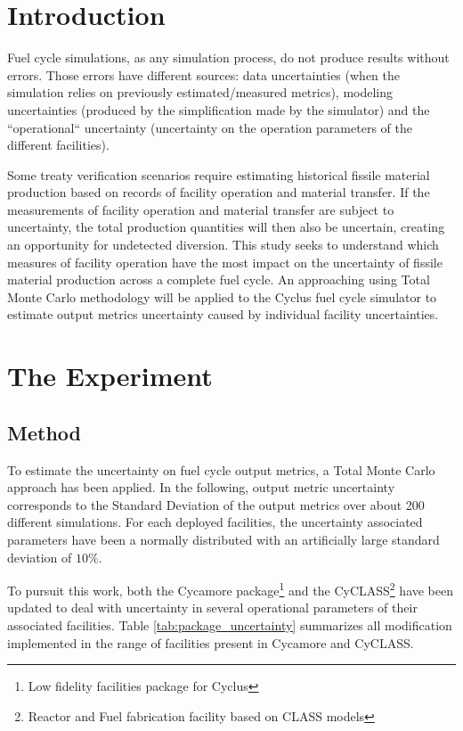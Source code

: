 \documentclass{anstrans}
\title{}
\author{Baptiste Mouginot,$^{*}$ Kathryn Mummah,$^{*}$ Paul P.H.  Wilson$^{*}$}
\institute{
$^{*}$University of Wisconsin-Madison, WI
}
\begin{document}
\section{Introduction}

Fuel cycle simulations, as any simulation process, do not produce results
without errors.  Those errors have different sources: data uncertainties (when
the simulation relies on previously estimated/measured metrics), modeling
uncertainties (produced by the simplification made by the simulator) and the
``operational`` uncertainty (uncertainty on the operation parameters of the
different facilities).

Some treaty verification scenarios require estimating historical fissile
material production based on records of facility operation and material
transfer.  If the measurements of facility operation and material transfer are
subject to uncertainty, the total production quantities will then also be
uncertain, creating an opportunity for undetected diversion.  This study seeks
to understand which measures of facility operation have the most impact on the
uncertainty of fissile material production across a complete fuel cycle.  An
approaching using Total Monte Carlo methodology will be applied to the Cyclus
fuel cycle simulator \cite{cyclus} to estimate output metrics uncertainty caused
by individual facility uncertainties.

\section{The Experiment}

\subsection{Method}

To estimate the uncertainty on fuel cycle output metrics, a Total Monte
Carlo approach has been applied.  In the following, output metric uncertainty
corresponds to the Standard Deviation of the output metrics over about 200
different simulations.  For each deployed facilities, the uncertainty associated
parameters have been a normally distributed with an artificially large standard
deviation of $10\%$.

To pursuit this work, both the Cycamore\cite{cycamore} package\footnote{Low
fidelity facilities package for Cyclus} and the
CyCLASS\footnote{Reactor and Fuel fabrication facility based on
    CLASS\cite{CLASS}  models} have been
updated\cite{mouginot_2018, cyclass} to deal with uncertainty in several
operational parameters of their associated facilities.  Table
\ref{tab:package_uncertainty} summarizes all modification implemented in the
range of facilities present in Cycamore and CyCLASS.
\end{document}
